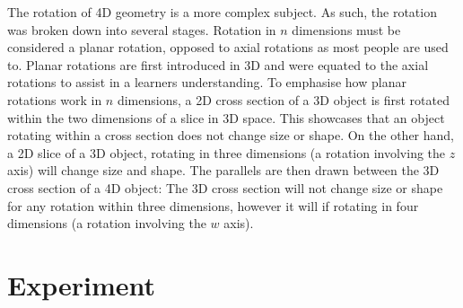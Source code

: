 \documentclass{l4proj}
\begin{document}
The rotation of 4D geometry is a more complex subject. As such, the rotation was broken down into several stages.
Rotation in \(n\) dimensions must be considered a planar rotation, opposed to axial rotations as most people are used to. 
Planar rotations are first introduced in 3D and were equated to the axial rotations to assist in a learners understanding.
To emphasise how planar rotations work in \(n\) dimensions, a 2D cross section of a 3D object is first rotated within the two dimensions of a slice in 3D space. This showcases that an object rotating within a cross section does not change size or shape. On the other hand, a 2D slice of a 3D object, rotating in three dimensions  (a rotation involving the $z$ axis) will change size and shape. The parallels are then drawn between the 3D cross section of a 4D object: The 3D cross section will not change size or shape for any rotation within three dimensions, however it will if rotating in four dimensions (a rotation involving the $w$ axis).

\section{Experiment}
\label{experimental_design}
\end{document}
